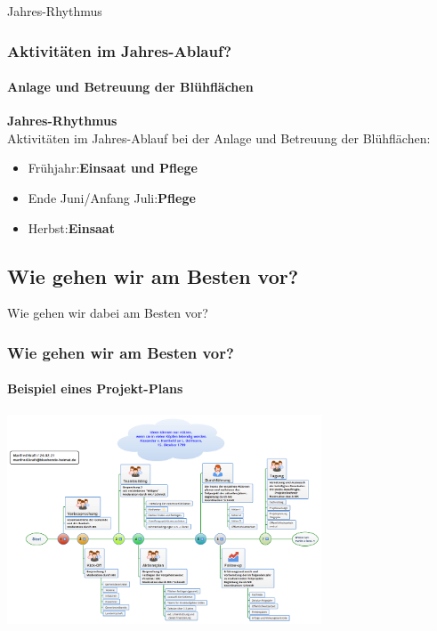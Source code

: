 \documentclass[aspectratio=169]{beamer}
\begin{document}
\begin{frame}{Jahres-Rhythmus}
\frametitle{Aktivitäten im Jahres-Ablauf?} 
\framesubtitle{Anlage und Betreuung der Blühflächen}

\textbf{Jahres-Rhythmus}\\
Aktivitäten im Jahres-Ablauf bei der Anlage und Betreuung der Blühflächen:

\begin{itemize}
	\item 
	Frühjahr:\pause   \textbf{Einsaat und Pflege}
	 \pause 
	\item 
	Ende Juni/Anfang Juli:\pause    \textbf{Pflege} \pause
	\item 
	Herbst:\pause    \textbf{Einsaat}%

\end{itemize}
\end{frame}


\subsection[Vorgehen]{Wie gehen wir am Besten vor?}

\begin{frame}{Wie gehen wir dabei am Besten vor?}
\frametitle{Wie gehen wir am Besten vor?} 
\framesubtitle{Beispiel eines Projekt-Plans}
\begin{center}
	
\includegraphics[width=0.7\textwidth]{figures/Ablaufplan_png}

\end{center}
\end{frame}

\end{document}
